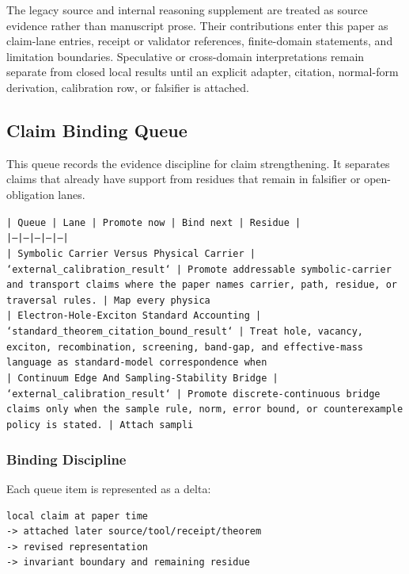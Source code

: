 \documentclass[11pt]{article}
\begin{document}
The legacy source and internal reasoning supplement are treated as source
evidence rather than manuscript prose. Their contributions enter this paper as
claim-lane entries, receipt or validator references, finite-domain statements,
and limitation boundaries. Speculative or cross-domain interpretations remain
separate from closed local results until an explicit adapter, citation,
normal-form derivation, calibration row, or falsifier is attached.
\subsection*{Claim Binding Queue}

This queue records the evidence discipline for claim strengthening. It separates claims that already have support from residues that remain in falsifier or open-obligation lanes.

\noindent\texttt{| Queue | Lane | Promote now | Bind next | Residue |}\\
\noindent\texttt{|---|---|---|---|---|}\\
\noindent\texttt{| Symbolic Carrier Versus Physical Carrier | `external\_calibration\_result` | Promote addressable symbolic-carrier and transport claims where the paper names carrier, path, residue, or traversal rules. | Map every physica}\\
\noindent\texttt{| Electron-Hole-Exciton Standard Accounting | `standard\_theorem\_citation\_bound\_result` | Treat hole, vacancy, exciton, recombination, screening, band-gap, and effective-mass language as standard-model correspondence when}\\
\noindent\texttt{| Continuum Edge And Sampling-Stability Bridge | `external\_calibration\_result` | Promote discrete-continuous bridge claims only when the sample rule, norm, error bound, or counterexample policy is stated. | Attach sampli}\\

\subsubsection*{Binding Discipline}

Each queue item is represented as a delta:

\begin{verbatim}
local claim at paper time
-> attached later source/tool/receipt/theorem
-> revised representation
-> invariant boundary and remaining residue
\end{verbatim}
\end{document}
